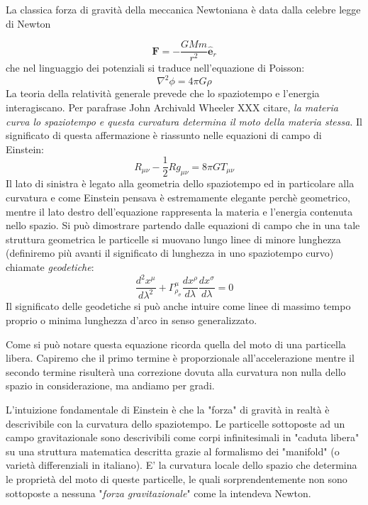 \documentclass[twoside]{article}
\begin{document}
La classica forza di gravità della meccanica Newtoniana è data dalla celebre legge di Newton

\begin{equation}
	\mathbf{F} = - \dfrac{G M m }{r^2} \hat{\mathbf{e}}_r
\end{equation}
che nel linguaggio dei potenziali si traduce nell'equazione di Poisson:
\begin{equation}
	\nabla^2 \phi = 4 \pi G \rho
\end{equation}
La teoria della relatività generale prevede che lo spaziotempo e l'energia interagiscano. Per parafrase John Archivald Wheeler XXX citare, \emph{la materia curva lo spaziotempo e questa curvatura determina il moto della materia
stessa}. Il significato di questa affermazione è riassunto nelle equazioni di campo di Einstein:
\begin{equation}
	R_{\mu \nu} - \dfrac{1}{2}R g_{\mu \nu} = 8\pi G T_{\mu \nu}
\end{equation}
Il lato di sinistra è legato alla geometria dello spaziotempo ed in particolare alla curvatura e come Einstein pensava è estremamente elegante perchè geometrico, mentre il lato destro dell'equazione rappresenta la materia e l'energia contenuta nello spazio. Si può dimostrare partendo dalle equazioni di campo che  in una tale struttura geometrica le particelle si muovano lungo linee di minore lunghezza (definiremo più avanti il significato di lunghezza in uno spaziotempo curvo) chiamate \emph{geodetiche}:
\begin{equation}
	\dfrac{d^2 x^\mu}{d \lambda^2} + \Gamma^{\mu}_{\rho_\sigma} \dfrac{d x^\rho}{d\lambda} \dfrac{d x^\sigma}{d \lambda} = 0
\end{equation}
Il significato delle geodetiche si può anche intuire come linee di massimo tempo proprio o minima lunghezza d'arco in senso generalizzato.

Come si può notare questa equazione ricorda quella del moto di una particella libera. Capiremo che il primo termine è proporzionale all'accelerazione mentre il secondo termine risulterà una correzione dovuta alla curvatura non nulla dello spazio in considerazione, ma andiamo per gradi.

L'intuizione fondamentale di Einstein è che la "forza" di gravità in realtà è descrivibile con la curvatura dello spaziotempo. Le particelle sottoposte ad un campo gravitazionale sono descrivibili come corpi infinitesimali in "caduta libera" su una struttura matematica descritta grazie al formalismo dei "manifold" (o varietà differenziali in italiano). E' la curvatura locale dello spazio che determina le proprietà del moto di queste particelle, le quali sorprendentemente non sono sottoposte a nessuna "\emph{forza gravitazionale}" come la intendeva Newton.
\end{document}
